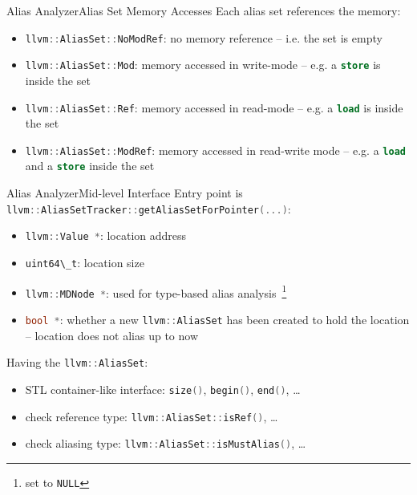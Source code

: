 \documentclass[10pt,mathserif]{beamer}
\newcommand{\cppinline}[1]{\lstinline[language=C++]!#1!}
\newcommand{\llvminline}[1]{\lstinline[language=LLVM]!#1!}
\begin{document}
\begin{frame}{Alias Analyzer}{Alias Set Memory Accesses}
Each alias set \alert{references} the memory:

\begin{itemize}
\item \cppinline{llvm::AliasSet::NoModRef}: no memory reference -- i.e. the set
      is empty
\item \cppinline{llvm::AliasSet::Mod}: memory accessed in write-mode -- e.g. a
      \llvminline{store} is inside the set
\item \cppinline{llvm::AliasSet::Ref}: memory accessed in read-mode -- e.g. a
      \llvminline{load} is inside the set
\item \cppinline{llvm::AliasSet::ModRef}: memory accessed in read-write mode --
      e.g. a \llvminline{load} and a \llvminline{store} inside the set
\end{itemize}
\end{frame}

\begin{frame}{Alias Analyzer}{Mid-level Interface}
Entry point is \cppinline{llvm::AliasSetTracker::getAliasSetForPointer(...)}:

\begin{itemize}
\item \cppinline{llvm::Value *}: location address
\item \cppinline{uint64\_t}: location size
\item \cppinline{llvm::MDNode *}: used for type-based alias
      analysis~\footnote{set to \cppinline{NULL}}
\item \cppinline{bool *}: whether a new \cppinline{llvm::AliasSet} has been
      created to hold the location -- location does not alias up to now
\end{itemize}

Having the \cppinline{llvm::AliasSet}:

\begin{itemize}
\item STL container-like interface: \cppinline{size()}, \cppinline{begin()},
      \cppinline{end()}, \ldots
\item check reference type: \cppinline{llvm::AliasSet::isRef()}, \ldots
\item check aliasing type: \cppinline{llvm::AliasSet::isMustAlias()}, \ldots
\end{itemize}
\end{frame}
\end{document}
